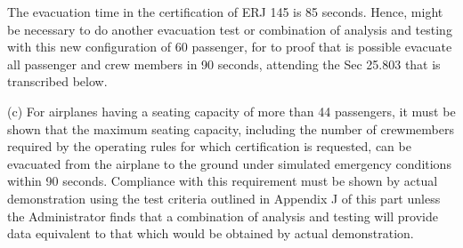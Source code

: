 The evacuation time in the certification of ERJ 145 is 85 seconds. Hence, might be necessary to do another evacuation test or combination of analysis and testing with this new configuration of 60 passenger, for to proof that is possible evacuate all passenger and crew members in 90 seconds, attending the Sec 25.803 that is transcribed below.

(c) For airplanes having a seating capacity of more than 44 passengers, it must be shown that the maximum seating capacity, including the number of crewmembers required by the operating rules for which certification is requested, can be evacuated from the airplane to the ground under simulated emergency conditions within 90 seconds. Compliance with this requirement must be shown by actual demonstration using the test criteria outlined in Appendix J of this part unless the Administrator finds that a combination of analysis and testing will provide data equivalent to that which would be obtained by actual demonstration.

